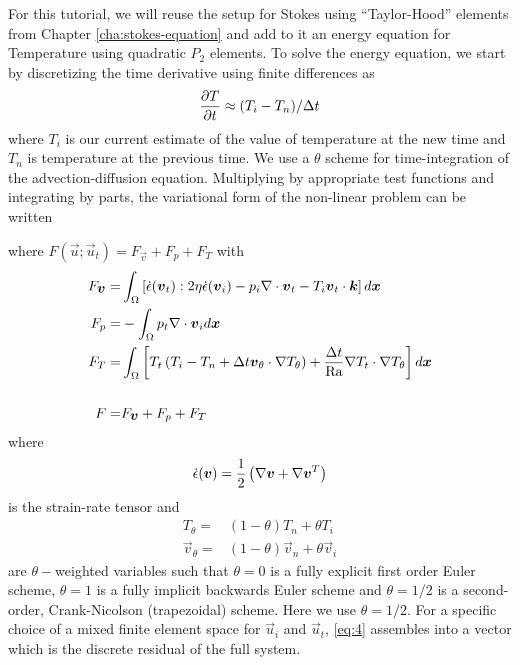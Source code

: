 For this tutorial, we will reuse the setup for  Stokes using
``Taylor-Hood'' elements from 
Chapter \ref{cha:stokes-equation} and add to it an energy equation for
Temperature using quadratic $P_{2}$ elements. To solve the energy
equation, we start by discretizing the time derivative
using finite differences as
\begin{displaymath}
  \frac{\partial T}{\partial t}\approx(T_{i} - T_{n})/\Delta t
\end{displaymath}
where $T_{i}$ is our current estimate of the value of temperature at the new
time and $T_{n}$ is temperature at the previous time. We use a
$\theta$ scheme  for time-integration of the advection-diffusion
equation.  Multiplying by appropriate test functions and integrating by parts, the
variational form of the non-linear problem can be written
\begin{quote}
\end{quote}
 where $F(\vec{u};\vec{u}_{t}) = F_{\vec{v}} + F_{p} + F_{T}$ with
\begin{align}
         F_{{\mbox{\boldmath$v$}}} =  & \int_\Omega \left[\dot{\epsilon}({\mbox{\boldmath$v$}}_{t}):
             2\eta \dot{\epsilon}({\mbox{\boldmath$v$}}_{i}) -
             p_{i}\nabla\cdot{\mbox{\boldmath$v$}}_t  - T_{i}{\mbox{\boldmath$v$}}_{t} \cdot{\mbox{\boldmath$k$}} \right]d{\mbox{\boldmath$x$}}  \\
 F_{p} =& -\int_\Omega p_t\nabla\cdot{\mbox{\boldmath$v$}}_{i} d{\mbox{\boldmath$x$}}\\
F_{T}  = &\int_\Omega \left[ T_t\left(T_{i} - T_{n} + \Delta t{\mbox{\boldmath$v$}}_{\theta}\cdot\nabla T_{\theta}\right) +\frac{\Delta t}{\mathrm{Ra}}\nabla
T_t \cdot\nabla T_\theta \right]d{\mbox{\boldmath$x$}} \label{eq:26}\\
\nonumber \\
  F = & F_{{\mbox{\boldmath$v$}}} + F_{p} + F_{T} 
\end{align}
where \begin{equation}
  \label{eq:19}
  \dot{\epsilon}({\mbox{\boldmath$v$}}) = \frac{1}{2}
  \left(
\nabla{\mbox{\boldmath$v$}} + \nabla{\mbox{\boldmath$v$}}^{T}
  \right)
\end{equation} is the strain-rate tensor and 
\begin{align*}
  T_{\theta} = & (1-\theta)T_{n} + \theta T_{i}\\
  \vec{v}_{\theta} = & (1-\theta)\vec{v}_{n} + \theta \vec{v}_{i}
\end{align*}
are $\theta-$weighted variables such that $\theta=0$ is a fully
explicit first order Euler scheme, $\theta = 1$ is a fully implicit
backwards Euler scheme and $\theta = 1/2$ is a second-order,
Crank-Nicolson (trapezoidal) scheme.  Here we use $\theta=1/2$.
For a specific choice of a mixed finite element space for $\vec{u}_{i}$ and
$\vec{u}_{t}$, \eqref{eq:4} assembles into a vector which is the
discrete residual of the full system. 

